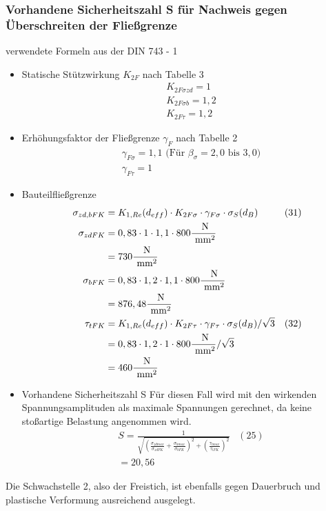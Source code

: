 \subsubsection{Vorhandene Sicherheitszahl S für Nachweis gegen Überschreiten der Fließgrenze}
verwendete Formeln aus der DIN 743 - 1
\begin{itemize}
	\item Statische Stützwirkung $K_{2F}$ nach Tabelle 3
	\begin{align*}
	&K_{2F \sigma zd} = 1 \\
	&K_{2F \sigma b} = 1,2 \\
	&K_{2F \tau} = 1,2 
	\end{align*}
	\item Erhöhungsfaktor der Fließgrenze $\gamma_{F}$ nach Tabelle 2
	\begin{align*}
	&\gamma_{F\sigma} = 1,1 \text{ (Für } \beta_{\sigma} = 2,0 \text{ bis } 3,0 \text{)} \\
	&\gamma_{F\tau} = 1 
	\end{align*}
	\item Bauteilfließgrenze
	\begin{align*}
	\sigma_{zd,bFK} &= K_{1,Re} (d_{eff}) \cdot K_{2F \sigma} \cdot \gamma_{F\sigma} \cdot \sigma_S (d_B) & (31) \\
	\sigma_{zdFK}&= 0,83 \cdot 1 \cdot 1,1 \cdot 800 \frac{\text{ N}}{\text{ mm}^2} \\
	&= 730 \frac{\text{ N}}{\text{ mm}^2}\\
	\sigma_{bFK}&= 0,83 \cdot 1,2 \cdot 1,1 \cdot 800 \frac{\text{ N}}{\text{ mm}^2} \\
	&= 876,48 \frac{\text{ N}}{\text{ mm}^2}\\
	\tau_{tFK} &= K_{1,Re} (d_{eff}) \cdot K_{2F \tau} \cdot \gamma_{F\tau} \cdot \sigma_S (d_B) / \sqrt{3} &(32) \\
	&= 0,83 \cdot 1,2 \cdot 1 \cdot 800 \frac{\text{ N}}{\text{ mm}^2} / \sqrt{3}\\
	&= 460 \frac{\text{ N}}{\text{ mm}^2}
	\end{align*}
	\item Vorhandene Sicherheitszahl S 
	Für diesen Fall wird mit den wirkenden Spannungsamplituden als maximale Spannungen gerechnet, da keine stoßartige Belastung angenommen wird. 
	\begin{align*}
	&S = \frac{1}{\sqrt{\left( \frac{\sigma_{zdmax}}{\sigma_{zdFK}}+\frac{\sigma_{bmax}}{\sigma_{bFK}} \right)^2 +\left( \frac{\tau_{tmax}}{\tau_{tFK}} \right)^2 }} & (25)\\
	&= 20,56 
	\end{align*}
\end{itemize}
Die Schwachstelle 2, also der Freistich, ist ebenfalls gegen Dauerbruch und plastische Verformung ausreichend ausgelegt.